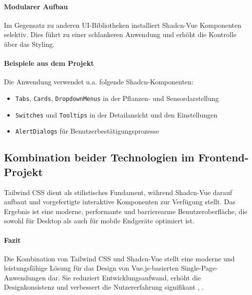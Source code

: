 \paragraph{Modularer Aufbau}
Im Gegensatz zu anderen UI-Bibliotheken installiert Shadcn-Vue Komponenten selektiv. Dies f\"uhrt zu einer schlankeren Anwendung und erh\"oht die Kontrolle \"uber das Styling.

\paragraph{Beispiele aus dem Projekt}
Die Anwendung verwendet u.a. folgende Sha\-dcn-Kom\-po\-nen\-ten:
\begin{itemize}
	\item \texttt{Tabs}, \texttt{Cards}, \texttt{DropdownMenus} in der Pflanzen- und Sensordarstellung
	\item \texttt{Switches} und \texttt{Tooltips} in der Detailansicht und den Einstellungen
	\item \texttt{AlertDialogs} f\"ur Benutzerbest\"atigungsprozesse
\end{itemize}

\subsection{Kombination beider Technologien im Frontend-Projekt}
Tailwind CSS dient als stilistisches Fundament, w\"ahrend Shadcn-Vue darauf aufbaut und vorgefertigte interaktive Komponenten zur Verf\"ugung stellt. Das Ergebnis ist eine moderne, performante und barrierearme Benutzeroberfl\"ache, die sowohl f\"ur Desktop als auch f\"ur mobile Endger\"ate optimiert ist.

\paragraph{Fazit}
Die Kombination von Tailwind CSS und Shadcn-Vue stellt eine moderne und leistungsf\"ahige L\"osung f\"ur das Design von Vue.js-basierten Single-Page-Anwendungen dar. Sie reduziert Entwicklungsaufwand, erh\"oht die Designkonsistenz und verbessert die Nutzererfahrung signifikant \cite{Guimaraes2021}, \cite{TailwindCSS}.
